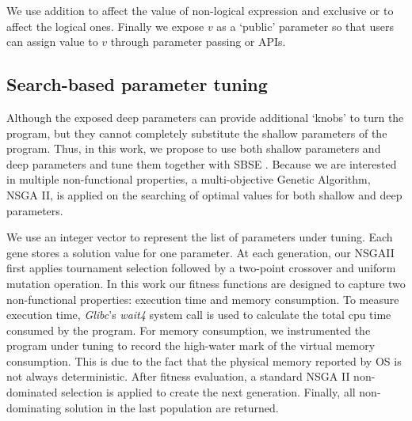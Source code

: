 We use addition to affect the value of non-logical expression and exclusive or to affect the logical ones.
Finally we expose $v$ as a `public' parameter so that users can assign value to $v$ through parameter passing or APIs.

\subsection{Search-based parameter tuning}
\label{sec_nsgaii}

Although the exposed deep parameters can provide additional `knobs' to turn the program, but they cannot completely substitute the shallow parameters of the program.  Thus, in this work, we propose to use both shallow parameters and deep parameters and tune them together with SBSE \cite{Harman:2007:CSF:1253532.1254729}. Because we are interested in multiple non-functional properties, a multi-objective Genetic Algorithm, NSGA II\cite{996017}, is applied on the searching of optimal values for both shallow and deep parameters.


We use an integer vector to represent the list of parameters under tuning. Each gene stores a solution value for one parameter. At each generation, our NSGAII first applies tournament selection followed by a two-point crossover and uniform mutation operation. In this work our fitness functions are designed to capture two non-functional properties: execution time and memory consumption. To measure execution time, \emph{Glibc}'s \emph{wait4} system call is used to calculate the total cpu time consumed by the program. For memory consumption, we instrumented the program under tuning to record the high-water mark of the virtual memory consumption. This is due to the fact that the physical memory reported by OS is not always deterministic. After fitness evaluation, a standard NSGA II non-dominated selection is applied to create the next generation. Finally, all non-dominating solution in the last population are returned.
